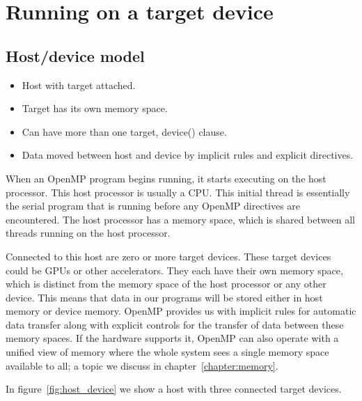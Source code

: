 
\chapter{Running on a target device}
\label{chapter:target}

\section{Host/device model}
\begin{itemize}
  \item Host with target attached.
  \item Target has its own memory space.
  \item Can have more than one target, device() clause.
  \item Data moved between host and device by implicit rules and explicit directives.
\end{itemize}

When an OpenMP program begins running, it starts executing on the host processor.
This host processor is usually a CPU.
This initial thread is essentially the serial program that is running before any OpenMP directives are encountered.
The host processor has a memory space, which is shared between all threads running on the host processor.

Connected to this host are zero or more target devices. These target devices could be GPUs or other accelerators.
They each have their own memory space, which is distinct from the memory space of the host processor or any other device.
This means that data in our programs will be stored either in host memory or device memory.
OpenMP provides us with implicit rules for automatic data transfer along with explicit controls for the transfer of data between these memory spaces.
If the hardware supports it, OpenMP can also operate with a unified view of memory where the whole system sees a single memory space available to all; a topic we discuss in chapter~\ref{chapter:memory}.

In figure~\ref{fig:host_device} we show a host with three connected target devices.

